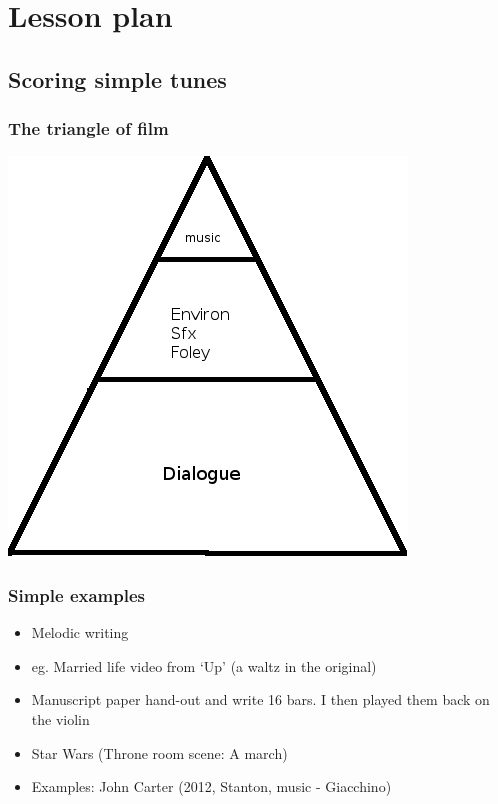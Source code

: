 
\chapter{Lesson plan}
\label{lessonplan}


\section{Scoring simple tunes}

\subsection{The triangle of film}
\includegraphics[scale=2.0]{triangleoffilm} 

\subsection{Simple examples}
\begin{itemize}
\item Melodic writing
\item eg. Married life video from `Up' (a waltz in the original)
\item Manuscript paper hand-out and write 16 bars. I then played them back on the violin
\item Star Wars (Throne room scene: A march)
\item Examples: John Carter (2012, Stanton, music - Giacchino)
\end{itemize}


